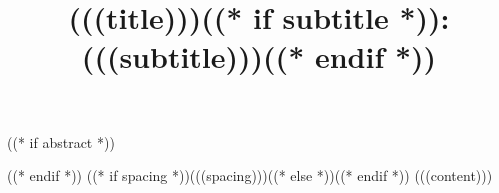 \documentclass[letterpaper,12pt, oneside]{article}
\title{(((title)))((* if subtitle *)):\\(((subtitle)))((* endif *))}
\begin{document}
\maketitle                              %

\onehalfspace
((* if abstract *))\begin{abstract}\end{abstract}((* endif *))
((* if spacing *))(((spacing)))((* else *))\doublespace((* endif *))
(((content)))
\end{document}
